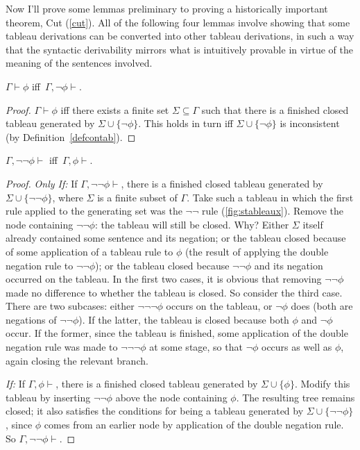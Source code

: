Now I'll prove some lemmas preliminary to proving a historically important theorem, Cut (\autoref{cut}). All of the following four lemmas involve showing that some tableau derivations can be converted into other tableau derivations, in such a way that the syntactic derivability mirrors what is intuitively provable in virtue of the meaning of the  sentences involved. 

\begin{lemma} \label{switch}
	$\Gamma \vdash \phi$ iff\, $\Gamma, \neg\phi \vdash$.
\end{lemma}
\begin{proof}
	$\Gamma \vdash \phi$ iff there exists a finite set $\Sigma\subseteq \Gamma$ such that there is a finished closed tableau generated by $\Sigma \cup\{\neg\phi\}$. This holds in turn iff $\Sigma\cup\{\neg\phi\}$ is inconsistent (by Definition~\ref{defcontab}).
\end{proof}
\begin{lemma} \label{dne}
	$\Gamma, \neg\neg\phi \vdash$ iff\, $\Gamma,\phi \vdash$.
\end{lemma}
\begin{proof}
\noindent\emph{Only If:}
	If $\Gamma, \neg\neg\phi \vdash$, there is a finished closed tableau generated by  $\Sigma \cup \{\neg\neg\phi\}$, where $\Sigma$ is a finite subset of $\Gamma$. Take such a tableau in which the first rule applied to the generating set was the $\neg\neg$ rule (\autoref{fig:stableaux}). Remove the node containing $\neg\neg\phi$: the tableau will still be closed. Why? Either  $\Sigma$ itself already contained some sentence and its negation; or the tableau closed because of some application of a tableau rule to $\phi$ (the result of applying the double negation rule to $\neg\neg\phi$); or the tableau closed because $\neg\neg\phi$ and its negation occurred on the tableau. In the first two cases, it is obvious that removing $\neg\neg\phi$ made no difference to whether the tableau is closed. So consider the third case. There are two subcases: either $\neg\neg\neg\phi$ occurs on the tableau, or $\neg\phi$ does (both are negations of $\neg\neg\phi$). If the latter, the tableau is closed because both $\phi$ and $\neg\phi$ occur. If the former, since the tableau is finished, some application of the double negation rule was made to $\neg\neg\neg\phi$ at some stage, so that $\neg\phi$ occurs as well as $\phi$, again closing the relevant branch.

	\noindent\emph{If:} If $\Gamma, \phi \vdash$, there is a finished closed tableau generated by $\Sigma\cup\{\phi\}$. Modify this tableau by inserting $¬¬\phi$ above the node containing $\phi$. The resulting tree remains closed; it also satisfies the conditions for being a tableau generated by $\Sigma\cup\{¬¬\phi\}$, since $\phi$ comes from an earlier node by application of the double negation rule. So $\Gamma, ¬¬\phi\vdash$.
\end{proof}


